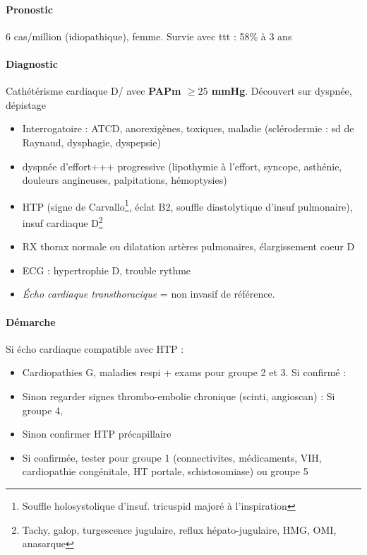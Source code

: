 \documentclass{book}
\begin{document}
\paragraph{Pronostic}
\label{sec:orgcda70b2}
6 cas/million (idiopathique), femme. Survie avec ttt : 58\% à 3 ans

\paragraph{Diagnostic}
\label{sec:org1ff04ef}
Cathétérisme cardiaque D/ avec \textbf{PAPm \(\ge 25\) mmHg}. Découvert sur dyspnée, dépistage
\begin{itemize}
\item Interrogatoire : ATCD, anorexigènes, toxiques, maladie (sclérodermie : sd de
Raynaud, dysphagie, dyspepsie)
\item dyspnée d'effort+++ progressive (lipothymie à l'effort,
syncope, asthénie, douleurs angineuses, palpitations, hémoptysies)
\item HTP (signe de Carvallo\footnote{Souffle holosystolique d'insuf. tricuspid majoré à l'inspiration}, éclat B2, souffle diastolytique d'insuf pulmonaire), insuf cardiaque D\footnote{Tachy, galop, turgescence jugulaire, reflux hépato-jugulaire, HMG, OMI, anasarque}
\item RX thorax normale ou dilatation artères pulmonaires, élargissement coeur D
\item ECG : hypertrophie D, trouble rythme
\item \emph{Écho cardiaque transthoracique} = non invasif de référence.
\end{itemize}

\paragraph{Démarche}
\label{sec:org11716d2}
Si écho cardiaque compatible avec HTP :

\begin{itemize}
\item Cardiopathies G, maladies respi + exams pour groupe 2 et 3. Si confirmé : \faHandStopO
\item Sinon regarder signes thrombo-embolie chronique (scinti, angioscan) : Si
groupe 4, \faHandStopO
\item Sinon confirmer HTP précapillaire
\item Si confirmée, tester pour groupe 1 (connectivites, médicaments, VIH,
cardiopathie congénitale, HT portale, schistosomiase) ou groupe 5
\end{itemize}
\end{document}
